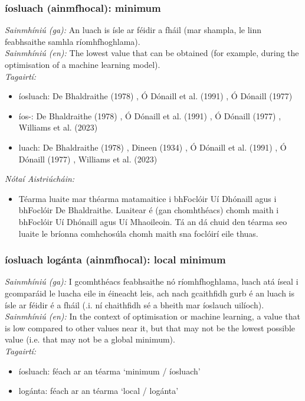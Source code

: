 \documentclass{article}
\begin{document}
\subsubsection*{íosluach (ainmfhocal): minimum}
 \noindent \textit{Sainmhíniú (ga):} An luach is ísle ar féidir a fháil (mar shampla, le linn feabhsaithe samhla ríomhfhoghlama).
\\
 \noindent \textit{Sainmhíniú (en):} The lowest value that can be obtained (for example, during the optimisation of a machine learning model).
\\
 \noindent \textit{Tagairtí:}
\begin{itemize}
	\item íosluach: De Bhaldraithe (1978) \cite{de-bhaldraithe}, Ó Dónaill et al. (1991) \cite{focloir-beag}, Ó Dónaill (1977) \cite{odonaill}
	\item íos-: De Bhaldraithe (1978) \cite{de-bhaldraithe}, Ó Dónaill et al. (1991) \cite{focloir-beag}, Ó Dónaill (1977) \cite{odonaill}, Williams et al. (2023) \cite{storchiste}
	\item luach: De Bhaldraithe (1978) \cite{de-bhaldraithe}, Dineen (1934) \cite{dineen}, Ó Dónaill et al. (1991) \cite{focloir-beag}, Ó Dónaill (1977) \cite{odonaill}, Williams et al. (2023) \cite{storchiste}
\end{itemize}

 \noindent \textit{Nótaí Aistriúcháin:}
\begin{itemize}
	\item Téarma luaite mar théarma matamaitice i bhFoclóir Uí Dhónaill agus i bhFoclóir De Bhaldraithe. Luaitear é (gan chomhthéacs) chomh maith i bhFoclóir Uí Dhónaill agus Uí Mhaoileoin. Tá an dá chuid den téarma seo luaite le bríonna comhchosúla chomh maith sna foclóirí eile thuas.
\end{itemize}


\subsubsection*{íosluach logánta (ainmfhocal): local minimum}
 \noindent \textit{Sainmhíniú (ga):} I gcomhthéacs feabhsaithe nó ríomhfhoghlama, luach atá íseal i gcomparáid le luacha eile in éineacht leis, ach nach gcaithfidh gurb é an luach is ísle ar féidir é a fháil (.i. ní chaithfidh sé a bheith mar íoslauch uilíoch).
\\
 \noindent \textit{Sainmhíniú (en):} In the context of optimisation or machine learning, a value that is low compared to other values near it, but that may not be the lowest possible value (i.e. that may not be a global minimum).
\\
 \noindent \textit{Tagairtí:}
\begin{itemize}
	\item íosluach: féach ar an téarma `minimum / íosluach'
	\item logánta: féach ar an téarma `local / logánta'
\end{itemize}
\end{document}
